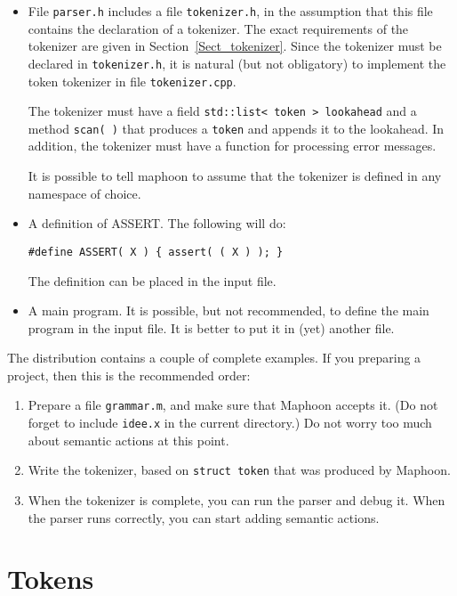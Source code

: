 \documentclass{article}
\begin{document}
\begin{itemize}
\item
   File \verb+parser.h+ includes a file
   \verb+tokenizer.h+, in the assumption that this file contains the 
   declaration of a tokenizer.  
   The exact requirements of the tokenizer are given in 
   Section~\ref{Sect_tokenizer}.
   Since the tokenizer must be declared in \verb+tokenizer.h+,
   it is natural (but not obligatory) to implement the
   token tokenizer in file \verb+tokenizer.cpp+.
   
   The tokenizer must have a field 
   \verb+std::list< token > lookahead+ and a method
   \verb+scan( )+ that produces a \verb+token+ and appends
   it to the lookahead. 
   In addition, the tokenizer must have a function for processing error 
   messages.
  
   It is possible to tell maphoon to assume that the 
   tokenizer is defined in any namespace of choice.
 
\item
   A definition of ASSERT. The following will do:
\begin{verbatim}
#define ASSERT( X ) { assert( ( X ) ); }
\end{verbatim}
   The definition can be placed in the input file.

\item
   A main program. It is possible, but not recommended, to define
   the main program in the input file. 
   It is better to put it in (yet) another file.

\end{itemize}

\noindent
The distribution contains a couple of complete examples.
If you preparing a project, then this is the recommended
order: 
\begin{enumerate}
\item
   Prepare a file \verb+grammar.m+, and make sure that
   Maphoon accepts it. 
   (Do not forget to include \verb+idee.x+ in the current directory.)
   Do not worry too much about semantic actions at this point.  
\item
   Write the tokenizer, based on \verb+struct token+ that was
   produced by Maphoon. 
\item
   When the tokenizer is complete, you can run the parser and debug it. 
   When the parser runs correctly,
   you can start adding semantic actions.
\end{enumerate}

\section{Tokens}
\end{document}
